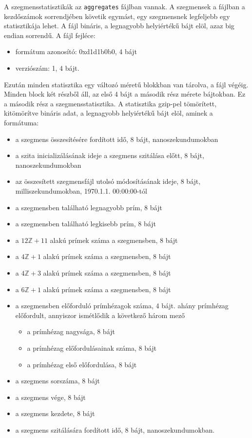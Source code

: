 A szegmensstatisztikák az \texttt{aggregates} fájlban vannak.
A szegmensek a fájlban a kezdőszámok sorrendjében követik egymást, egy szegmensnek legfeljebb egy statisztikája lehet.
A fájl bináris, a legnagyobb helyiértékű bájt elöl, azaz big endian sorrendű. A fájl fejléce:
\begin{itemize}
\item formátum azonosító: 0xd1d1b0b0, 4 bájt
\item verziószám: 1, 4 bájt.
\end{itemize}
Ezután minden statisztika egy változó méretű blokkban van tárolva, a fájl végéig.
Minden block két részből áll, az első 4 bájt a második rész mérete bájtokban.
Ez a második rész a szegmensstatisztika.
A statisztika gzip-pel tömörített, kitömörítve bináris adat, a legnagyobb helyiértékű bájt elöl, aminek a formátuma:
\begin{itemize}
\item a szegmens összesítésére fordított idő, 8 bájt, nanoszekundumokban
\item a szita inicializálásának ideje a szegmens szitálása előtt, 8 bájt, nanoszekundumokban
\item az összesített szegmensfájl utolsó módosításának ideje, 8 bájt, milliszekundumokban, 1970.1.1. 00:00:00-tól
\item a szegmensben található legnagyobb prím, 8 bájt
\item a szegmensben található legkisebb prím, 8 bájt
\item a $12\mathbb{Z}+11$ alakú prímek száma a szegmensben, 8 bájt
\item a $4\mathbb{Z}+1$ alakú prímek száma a szegmensben, 8 bájt
\item a $4\mathbb{Z}+3$ alakú prímek száma a szegmensben, 8 bájt
\item a $6\mathbb{Z}+1$ alakú prímek száma a szegmensben, 8 bájt
\item a szegmensben előforduló prímhézagok száma, 4 bájt. ahány prímhézag előfordult, annyiszor ismétlődik a következő három mező
\begin{itemize}
\item a prímhézag nagysága, 8 bájt
\item a prímhézag előfordulásainak száma, 8 bájt
\item a prímhézag első előfordulása, 8 bájt
\end{itemize}
\item a szegmens sorszáma, 8 bájt
\item a szegmens vége, 8 bájt
\item a szegmens kezdete, 8 bájt
\item a szegmens szitálására fordított idő, 8 bájt, nanoszekundumokban.
\end{itemize}

